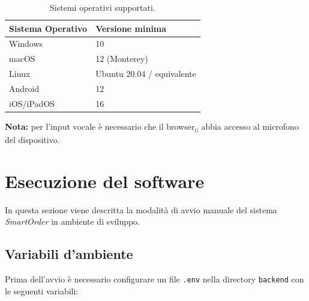 \documentclass[a4paper, 11pt, oneside]{scrartcl}
\begin{document}
\begin{table}[H]
    \centering
    \renewcommand{\arraystretch}{1.2}
    \begin{tabular}{ll}
        \toprule
        \textbf{Sistema Operativo} & \textbf{Versione minima} \\
        \midrule
        Windows    & 10 \\
        macOS      & 12 (Monterey) \\
        Linux      & Ubuntu 20.04 / equivalente \\
        Android    & 12 \\
        iOS/iPadOS & 16 \\
        \bottomrule
    \end{tabular}
    \caption{Sistemi operativi supportati.}
    \label{tab:req-os}
\end{table}

\textbf{Nota:} per l'input vocale \`e necessario che il browser\textsubscript{\textsc{g}} abbia accesso al microfono del dispositivo.


\newpage
\section{Esecuzione del software}

In questa sezione viene descritta la modalit\`a di avvio manuale del sistema \textit{SmartOrder} in ambiente di sviluppo.

\subsection{Variabili d'ambiente}

Prima dell'avvio \`e necessario configurare un file \texttt{.env} nella directory \texttt{backend} con le seguenti variabili:
\end{document}
